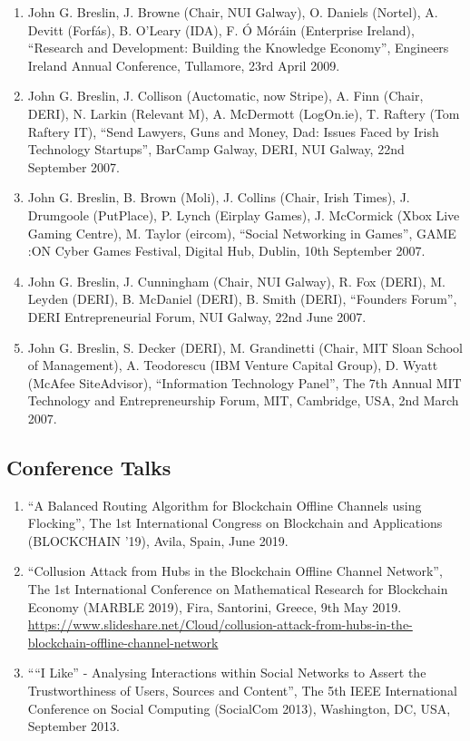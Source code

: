 \documentclass[10pt,a4paper]{res} %
\begin{document}
\begin{resume}
\begin{enumerate}
\item John G. Breslin, J. Browne (Chair, NUI Galway), O. Daniels (Nortel), A. Devitt (Forf\'{a}s), B. O'Leary (IDA), F. \'{O} M\'{o}r\'{a}in (Enterprise Ireland), ``Research and Development: Building the Knowledge Economy'', Engineers Ireland Annual Conference, Tullamore, 23rd April 2009.
\item John G. Breslin, J. Collison (Auctomatic, now Stripe), A. Finn (Chair, DERI), N. Larkin (Relevant M), A. McDermott (LogOn.ie), T. Raftery (Tom Raftery IT), ``Send Lawyers, Guns and Money, Dad: Issues Faced by Irish Technology Startups'', BarCamp Galway, DERI, NUI Galway, 22nd September 2007.
\item John G. Breslin, B. Brown (Moli), J. Collins (Chair, Irish Times), J. Drumgoole (PutPlace), P. Lynch (Eirplay Games), J. McCormick (Xbox Live Gaming Centre), M. Taylor (eircom), ``Social Networking in Games'', GAME :ON Cyber Games Festival, Digital Hub, Dublin, 10th September 2007.
\item John G. Breslin, J. Cunningham (Chair, NUI Galway), R. Fox (DERI), M. Leyden (DERI), B. McDaniel (DERI), B. Smith (DERI), ``Founders Forum'', DERI Entrepreneurial Forum, NUI Galway, 22nd June 2007.
\item John G. Breslin, S. Decker (DERI), M. Grandinetti (Chair, MIT Sloan School of Management), A. Teodorescu (IBM Venture Capital Group), D. Wyatt (McAfee SiteAdvisor), ``Information Technology Panel'', The 7th Annual MIT Technology and Entrepreneurship Forum, MIT, Cambridge, USA, 2nd March 2007.
\end{enumerate}

\subsection*{Conference Talks}

\begin{enumerate} \itemsep -2pt
\item ``A Balanced Routing Algorithm for Blockchain Offline Channels using Flocking'', The 1st International Congress on Blockchain and Applications (BLOCKCHAIN '19), Avila, Spain, June 2019.
\item ``Collusion Attack from Hubs in the Blockchain Offline Channel Network'', The 1st International Conference on Mathematical Research for Blockchain Economy (MARBLE 2019), Fira, Santorini, Greece, 9th May 2019. \url{https://www.slideshare.net/Cloud/collusion-attack-from-hubs-in-the-blockchain-offline-channel-network}
\item ````I Like'' - Analysing Interactions within Social Networks to Assert the Trustworthiness of Users, Sources and Content'', The 5th IEEE International Conference on Social Computing (SocialCom 2013), Washington, DC, USA, September 2013.
\end{enumerate}
 

\end{resume}
\end{document}

